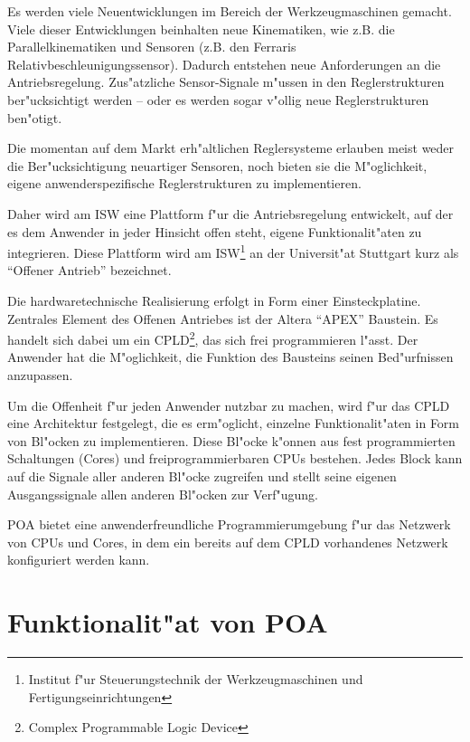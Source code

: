 \documentclass[a4paper,titlepage,12pt,ngerman]{scrbook}
\begin{document}
Es werden viele Neuentwicklungen im Bereich der Werkzeugmaschinen gemacht.
Viele dieser Entwicklungen beinhalten neue Kinematiken, wie z.B. die
Parallelkinematiken und Sensoren (z.B. den Ferraris 
Relativbeschleunigungssensor).
Dadurch entstehen neue Anforderungen an die Antriebsregelung. Zus"atzliche
Sensor-Signale m"ussen in den Reglerstrukturen ber"ucksichtigt werden -- oder
es werden sogar v"ollig neue Reglerstrukturen ben"otigt.\par
Die momentan auf dem Markt erh"altlichen Reglersysteme erlauben meist
weder die Ber"ucksichtigung neuartiger Sensoren, noch bieten sie die
M"oglichkeit, eigene anwenderspezifische Reglerstrukturen zu implementieren.\par
Daher wird am ISW eine Plattform f"ur die Antriebsregelung entwickelt,
auf der es dem Anwender in jeder Hinsicht offen steht, eigene Funktionalit"aten
zu integrieren. Diese Plattform wird am ISW\footnote{Institut f"ur Steuerungstechnik
der Werkzeugmaschinen und Fertigungseinrichtungen} an der Universit"at Stuttgart kurz
als ``Offener Antrieb'' bezeichnet.  \par
Die hardwaretechnische Realisierung erfolgt in Form einer Einsteckplatine.
Zentrales Element des Offenen Antriebes ist der Altera ``APEX'' Baustein. Es
handelt sich dabei um ein CPLD\footnote{Complex Programmable Logic Device},
das sich frei programmieren l"asst. Der Anwender hat die M"oglichkeit, die
Funktion des Bausteins seinen Bed"urfnissen anzupassen.\par
Um die Offenheit f"ur jeden Anwender nutzbar zu machen, wird f"ur das CPLD eine
Architektur festgelegt, die es erm"oglicht, einzelne Funktionalit"aten in Form
von Bl"ocken zu implementieren. Diese Bl"ocke k"onnen aus fest programmierten
Schaltungen (Cores) und freiprogrammierbaren CPUs bestehen. Jedes Block kann
auf die Signale aller anderen Bl"ocke zugreifen und stellt seine eigenen
Ausgangssignale allen anderen Bl"ocken zur Verf"ugung.\par
POA bietet eine anwenderfreundliche Programmierumgebung f"ur das Netzwerk
von CPUs und Cores, in dem ein bereits auf dem CPLD vorhandenes
Netzwerk konfiguriert werden kann.\newpage




\section{Funktionalit"at von POA}
\end{document}
